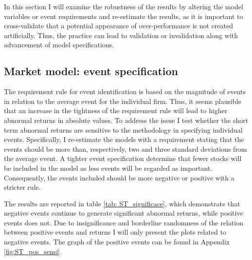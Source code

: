 

In this section I will examine the robustness of the results by altering the model variables or event requirements and re-estimate the results, as it is important to cross-validate that a potential appearance of over-performance is not created artificially. Thus, the practice can lead to validation or invalidation along with advancement of model specifications. 

\subsection{Market model: event specification}
The requirement rule for event identification is based on the magnitude of events in relation to the average event for the individual firm. Thus, it seems plausible that an increase in the tightness of the requirement rule will lead to higher abnormal returns in absolute values.  
To address the issue I test whether the short term abnormal returns are sensitive to the methodology in specifying individual events. Specifically, I re-estimate the models with a requirement stating that the events should be more than, respectively, two and three standard deviations from the average event. A tighter event specification determine that fewer stocks will be included in the model as less events will be regarded as important. Consequently, the events included should be more negative or positive with a stricter rule. 



The results are reported in table \ref{tab: ST_significace}, which demonstrate that negative events continue to generate significant abnormal returns, while positive events does not. Due to insignificance and borderline randomness of the relation between positive events and returns I will only present the plots related to negative events. The graph of the positive events can be found in Appendix \ref{fig:ST_pos_sensi}. 


